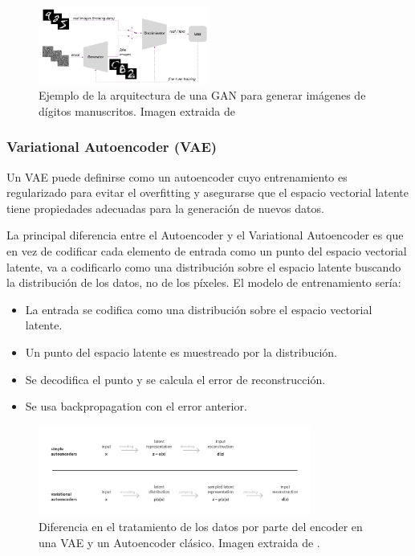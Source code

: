             \begin{figure}[!h]
                \centering
                \includegraphics[width=0.5\textwidth]{img/GAN.png}
                \caption{Ejemplo de la arquitectura de una GAN para generar imágenes de dígitos manuscritos. Imagen extraida de \cite{AAE}}
                \label{fig:GAN}
            \end{figure}
 
        \subsubsection{Variational Autoencoder (VAE)}
            \noindent Un VAE puede definirse como un autoencoder cuyo entrenamiento es regularizado para evitar el overfitting y asegurarse que el espacio vectorial latente tiene propiedades adecuadas para la generación de nuevos datos.

            \medskip

            \noindent La principal diferencia entre el Autoencoder y el Variational Autoencoder es que en vez de codificar cada elemento de entrada como un punto del espacio vectorial latente, va a codificarlo como una distribución sobre el espacio latente buscando la distribución de los datos, no de los píxeles. El modelo de entrenamiento sería:
            
            \begin{itemize}
                \item La entrada se codifica como una distribución sobre el espacio vectorial latente.
                \item Un punto del espacio latente es muestreado por la distribución. 
                \item Se decodifica el punto y se calcula el error de reconstrucción.
                \item Se usa backpropagation con el error anterior.
            \end{itemize}

            \begin{figure}[!h]
                \centering
                \includegraphics[width=0.8\textwidth]{img/vae_1.png}
                \caption{Diferencia en el tratamiento de los datos por parte del encoder en una VAE y un Autoencoder clásico. Imagen extraida de \cite{VAE}.}
                \label{fig:VAE_1}
            \end{figure}

